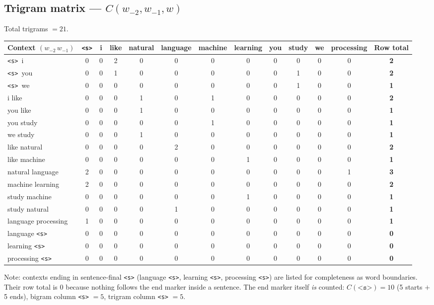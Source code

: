 \documentclass[11pt]{article}
\newcommand{\sTok}{\texttt{<s>}}
\begin{document}
\subsection*{Trigram matrix --- $C(w_{-2}, w_{-1}, w)$}
Total trigrams $= 21$.
\begin{table}[h]
\centering
\footnotesize
\setlength{\tabcolsep}{4pt}
\begin{tabular}{lcccccccccccc}
\toprule
Context $(w_{-2}\,w_{-1})$ & \sTok & i & like & natural & language & machine & learning & you & study & we & processing & Row total \\
\midrule
\sTok\ i & 0 & 0 & 2 & 0 & 0 & 0 & 0 & 0 & 0 & 0 & 0 & \textbf{2} \\
\sTok\ you & 0 & 0 & 1 & 0 & 0 & 0 & 0 & 0 & 1 & 0 & 0 & \textbf{2} \\
\sTok\ we & 0 & 0 & 0 & 0 & 0 & 0 & 0 & 0 & 1 & 0 & 0 & \textbf{1} \\
i like & 0 & 0 & 0 & 1 & 0 & 1 & 0 & 0 & 0 & 0 & 0 & \textbf{2} \\
you like & 0 & 0 & 0 & 1 & 0 & 0 & 0 & 0 & 0 & 0 & 0 & \textbf{1} \\
you study & 0 & 0 & 0 & 0 & 0 & 1 & 0 & 0 & 0 & 0 & 0 & \textbf{1} \\
we study & 0 & 0 & 0 & 1 & 0 & 0 & 0 & 0 & 0 & 0 & 0 & \textbf{1} \\
like natural & 0 & 0 & 0 & 0 & 2 & 0 & 0 & 0 & 0 & 0 & 0 & \textbf{2} \\
like machine & 0 & 0 & 0 & 0 & 0 & 0 & 1 & 0 & 0 & 0 & 0 & \textbf{1} \\
natural language & 2 & 0 & 0 & 0 & 0 & 0 & 0 & 0 & 0 & 0 & 1 & \textbf{3} \\
machine learning & 2 & 0 & 0 & 0 & 0 & 0 & 0 & 0 & 0 & 0 & 0 & \textbf{2} \\
study machine & 0 & 0 & 0 & 0 & 0 & 0 & 1 & 0 & 0 & 0 & 0 & \textbf{1} \\
study natural & 0 & 0 & 0 & 0 & 1 & 0 & 0 & 0 & 0 & 0 & 0 & \textbf{1} \\
language processing & 1 & 0 & 0 & 0 & 0 & 0 & 0 & 0 & 0 & 0 & 0 & \textbf{1} \\
language \sTok & 0 & 0 & 0 & 0 & 0 & 0 & 0 & 0 & 0 & 0 & 0 & \textbf{0} \\
learning \sTok & 0 & 0 & 0 & 0 & 0 & 0 & 0 & 0 & 0 & 0 & 0 & \textbf{0} \\
processing \sTok & 0 & 0 & 0 & 0 & 0 & 0 & 0 & 0 & 0 & 0 & 0 & \textbf{0} \\
\bottomrule
\end{tabular}
\end{table}

Note: contexts ending in sentence-final \sTok{} (language \sTok, learning \sTok, processing \sTok) are listed for completeness as word boundaries. Their row total is $0$ because nothing follows the end marker inside a sentence. The end marker itself \emph{is} counted: $C(\sTok)=10$ (5 starts $+$ 5 ends), bigram column \sTok{} $=5$, trigram column \sTok{} $=5$.
\end{document}
